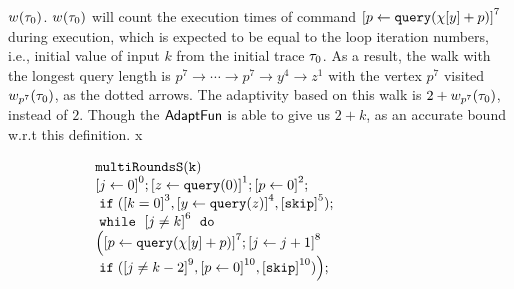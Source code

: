 \begin{example}
{    $w_{}(\mathtt{\tau}_0)$. $w_{}(\mathtt{\tau}_0)$ will count the execution times of command $\clabel{\assign{p}{\query(\chi[y]+p)} }^{7}$ during execution, which is expected to be equal to the loop iteration numbers, i.e., initial value of input $k$ from the initial trace $\mathtt{\tau}_0$.
    As a result, the walk with the longest query length 
    is
    $p^7  \to \cdots \to p^7 \to y^4  \to z^1 $ with the vertex $p^7$ visited $w_{p^7}(\mathtt{\tau}_0)$, as the dotted arrows. 
    The adaptivity based on this walk
    is $2 + w_{p^7}(\mathtt{\tau}_0)$, instead of $2$. 
    Though the $\textsf{AdaptFun}$ is able to give us $2 + k$,  as an accurate bound w.r.t this definition.
x}
        {\small
        \begin{figure}
            \centering
           \quad
           \begin{subfigure}{.35\textwidth}
           \begin{centering}
       {\footnotesize
           $ \begin{array}{l}
                   \kw{multiRoundsS(k)}\\
                      \clabel{ \assign{j}{0}}^{0} ; 
                       \clabel{\assign{z}{\query(0)} }^{1} ;             
                       \clabel{\assign{p}{0} }^{2} ; \\
                       \eif(\clabel{ k = 0}^{3}, 
                       \clabel{ \assign{y}{\query(z)}}^{4}, \clabel{\eskip}^5);\\
                       \ewhile ~ \clabel{j \neq k}^{6} ~ \edo ~ \\
                       \Big(
                        \clabel{\assign{p}{\query(\chi[y]+p)} }^{7}  ; 
                        \clabel{\assign{j}{j + 1}}^{8}\\
                     \eif(\clabel{ j \neq k - 2}^{9}, 
                     \clabel{ \assign{p}{0}}^{10} ,\clabel{\eskip}^{10})
                \Big);\\
                   \end{array}
           $       
       }
           \caption{}
           \end{centering}
           \end{subfigure}
           \begin{subfigure}{.6\textwidth}
               \begin{centering}
\end{centering}
\end{subfigure}
\end{figure}}
\end{example}

